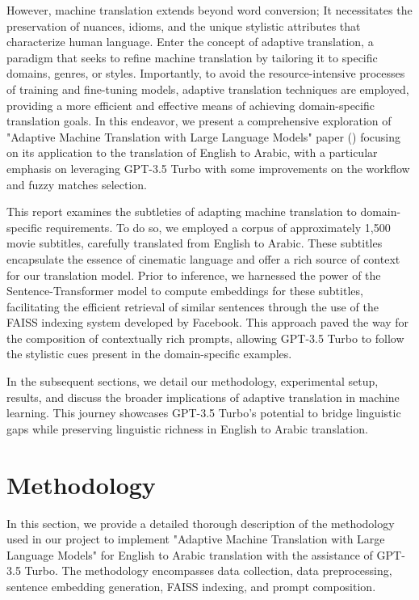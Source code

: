 \documentclass[12pt]{article}
\begin{document}
However, machine translation extends beyond word conversion; It necessitates the preservation of nuances, idioms, and the unique stylistic attributes that characterize human language. Enter the concept of adaptive translation, a paradigm that seeks to refine machine translation by tailoring it to specific domains, genres, or styles. Importantly, to avoid the resource-intensive processes of training and fine-tuning models, adaptive translation techniques are employed, providing a more efficient and effective means of achieving domain-specific translation goals. In this endeavor, we present a comprehensive exploration of "Adaptive Machine Translation with Large Language Models" paper (\cite{moslem2023adaptive})  focusing on its application to the translation of English to Arabic, with a particular emphasis on leveraging GPT-3.5 Turbo with some improvements on the workflow and fuzzy matches selection.


This report examines the subtleties of adapting machine translation to domain-specific requirements. To do so, we employed a corpus of approximately 1,500 movie subtitles, carefully translated from English to Arabic. These subtitles encapsulate the essence of cinematic language and offer a rich source of context for our translation model. Prior to inference, we harnessed the power of the Sentence-Transformer model to compute embeddings for these subtitles, facilitating the efficient retrieval of similar sentences through the use of the FAISS indexing system developed by Facebook. This approach paved the way for the composition of contextually rich prompts, allowing GPT-3.5 Turbo to follow the stylistic cues present in the domain-specific examples.


In the subsequent sections, we detail our methodology, experimental setup, results, and discuss the broader implications of adaptive translation in machine learning. This journey showcases GPT-3.5 Turbo's potential to bridge linguistic gaps while preserving linguistic richness in English to Arabic translation.


\section{Methodology}

In this section, we provide a detailed thorough description of the methodology used in our project to implement "Adaptive Machine Translation with Large Language Models" for English to Arabic translation with the assistance of GPT-3.5 Turbo. The methodology encompasses data collection, data preprocessing, sentence embedding generation, FAISS indexing, and prompt composition.
\end{document}
